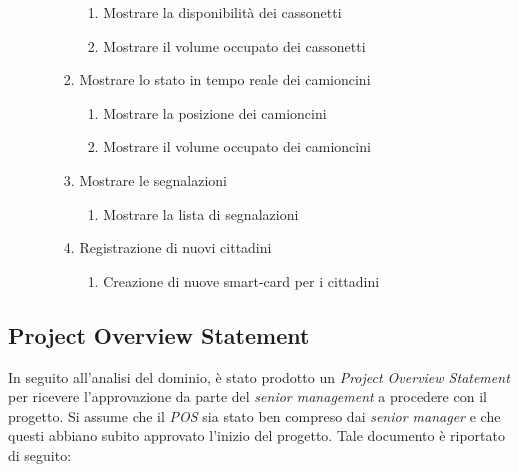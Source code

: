 \begin{itemize}
\begin{enumerate}[label*=\arabic*.]
\begin{enumerate}[label*=\arabic*.]
            \begin{enumerate}[label*=\arabic*.]
                \item Mostrare la disponibilità dei cassonetti
                \item Mostrare il volume occupato dei cassonetti
            \end{enumerate}
            \item Mostrare lo stato in tempo reale dei camioncini
            \begin{enumerate}[label*=\arabic*.]
                \item Mostrare la posizione dei camioncini
                \item Mostrare il volume occupato dei camioncini
            \end{enumerate}
            \item Mostrare le segnalazioni
            \begin{enumerate}[label*=\arabic*.]
                \item Mostrare la lista di segnalazioni
            \end{enumerate}
            \item Registrazione di nuovi cittadini
            \begin{enumerate}[label*=\arabic*.]
                \item Creazione di nuove smart-card per i cittadini
            \end{enumerate}
        \end{enumerate}
    \end{enumerate}
\end{itemize}

\subsection{Project Overview Statement}
In seguito all'analisi del dominio, è stato prodotto un \textit{Project Overview Statement} per ricevere l'approvazione da parte del \textit{senior management} a procedere con il progetto. Si assume che il \textit{POS} sia stato ben compreso dai \textit{senior manager} e che questi abbiano subito approvato l'inizio del progetto. Tale documento è riportato di seguito:

